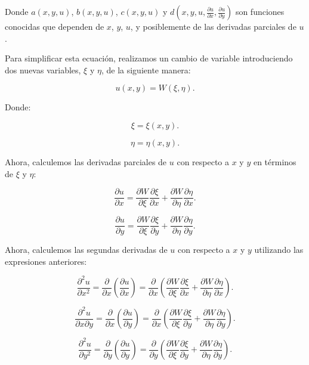 \documentclass[11pt]{book}
\theoremstyle{plain}
\theoremstyle{definition}
\begin{document}
Donde $a(x, y, u)$, $b(x, y, u)$, $c(x, y, u)$ y $d(x, y, u, \frac{\partial u}{\partial x}, \frac{\partial u}{\partial y})$ son funciones conocidas que dependen de $x$, $y$, $u$, y posiblemente de las derivadas parciales de $u$.


Para simplificar esta ecuación, realizamos un cambio de variable introduciendo dos nuevas variables, $\xi$ y $\eta$, de la siguiente manera:

\[
u(x, y) = W(\xi, \eta)
.\]

Donde:

\[
\xi = \xi(x, y)
.\]

\[
\eta = \eta(x, y)
.\]

Ahora, calculemos las derivadas parciales de $u$ con respecto a $x$ y $y$ en términos de $\xi$ y $\eta$:

\[
\frac{\partial u}{\partial x} = \frac{\partial W}{\partial \xi} \frac{\partial \xi}{\partial x} + \frac{\partial W}{\partial \eta} \frac{\partial \eta}{\partial x}
.\]

\[
\frac{\partial u}{\partial y} = \frac{\partial W}{\partial \xi} \frac{\partial \xi}{\partial y} + \frac{\partial W}{\partial \eta} \frac{\partial \eta}{\partial y}
.\]

Ahora, calculemos las segundas derivadas de $u$ con respecto a $x$ y $y$ utilizando las expresiones anteriores:

\[
\frac{\partial^2 u}{\partial x^2} = \frac{\partial}{\partial x}\left(\frac{\partial u}{\partial x}\right) = \frac{\partial}{\partial x}\left(\frac{\partial W}{\partial \xi} \frac{\partial \xi}{\partial x} + \frac{\partial W}{\partial \eta} \frac{\partial \eta}{\partial x}\right)
.\]

\[
\frac{\partial^2 u}{\partial x \partial y} = \frac{\partial}{\partial x}\left(\frac{\partial u}{\partial y}\right) = \frac{\partial}{\partial x}\left(\frac{\partial W}{\partial \xi} \frac{\partial \xi}{\partial y} + \frac{\partial W}{\partial \eta} \frac{\partial \eta}{\partial y}\right)
.\]

\[
\frac{\partial^2 u}{\partial y^2} = \frac{\partial}{\partial y}\left(\frac{\partial u}{\partial y}\right) = \frac{\partial}{\partial y}\left(\frac{\partial W}{\partial \xi} \frac{\partial \xi}{\partial y} + \frac{\partial W}{\partial \eta} \frac{\partial \eta}{\partial y}\right)
.\]
\end{document}
